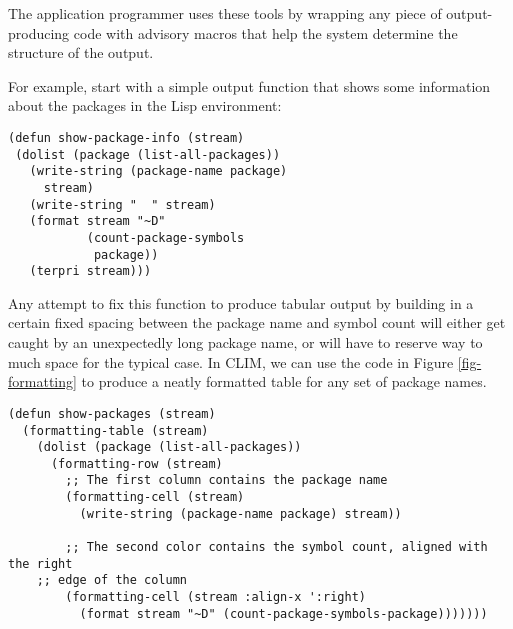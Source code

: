 \documentclass[twocolumn,a4paper]{article}
\newcommand {\CLIM}{{\small CLIM}}
\begin{document}
The application programmer uses these tools by wrapping any piece of output-producing code with advisory macros that help the system determine the structure of the output.

For example, start with a simple output function that shows some information about the packages in the Lisp environment:
\lstset{style=inlinestyle}
\begin{lstlisting}
(defun show-package-info (stream)
 (dolist (package (list-all-packages)) 
   (write-string (package-name package) 
     stream)
   (write-string "  " stream) 
   (format stream "~D" 
           (count-package-symbols 
            package)) 
   (terpri stream)))
\end{lstlisting}
Any attempt to fix this function to produce tabular output by building in a certain fixed spacing between the package name and symbol count will either get caught by an unexpectedly long package name, or will have to reserve way to much space for the typical case. In \CLIM{}, we can use the code in Figure \ref{fig-formatting} to produce a neatly formatted table for any set of package names.
\begin{figure*}
\lstset{style=framestyle}
\begin{lstlisting}
(defun show-packages (stream)
  (formatting-table (stream)
    (dolist (package (list-all-packages))
      (formatting-row (stream)
        ;; The first column contains the package name
        (formatting-cell (stream)
          (write-string (package-name package) stream))

        ;; The second color contains the symbol count, aligned with the right 
	;; edge of the column 
        (formatting-cell (stream :align-x ':right)
          (format stream "~D" (count-package-symbols-package)))))))
\end{lstlisting}
\caption{An output function that uses table formatting.}\label{fig-formatting}
\end{figure*}

\end{document}
